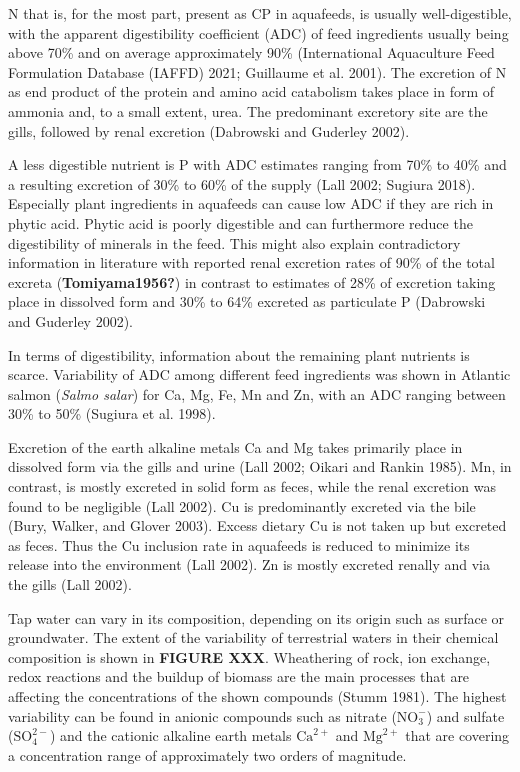\documentclass[
]{article}
\begin{document}
N that is, for the most part, present as CP in aquafeeds, is usually well-digestible, with the apparent digestibility coefficient (ADC) of feed ingredients usually being above 70\% and on average approximately 90\% (International Aquaculture Feed Formulation Database (IAFFD) 2021; Guillaume et al. 2001). The excretion of N as end product of the protein and amino acid catabolism takes place in form of ammonia and, to a small extent, urea. The predominant excretory site are the gills, followed by renal excretion (Dabrowski and Guderley 2002).

A less digestible nutrient is P with ADC estimates ranging from 70\% to 40\% and a resulting excretion of 30\% to 60\% of the supply (Lall 2002; Sugiura 2018). Especially plant ingredients in aquafeeds can cause low ADC if they are rich in phytic acid. Phytic acid is poorly digestible and can furthermore reduce the digestibility of minerals in the feed. This might also explain contradictory information in literature with reported renal excretion rates of 90\% of the total excreta (\textbf{Tomiyama1956?}) in contrast to estimates of 28\% of excretion taking place in dissolved form and 30\% to 64\% excreted as particulate P (Dabrowski and Guderley 2002).

In terms of digestibility, information about the remaining plant nutrients is scarce. Variability of ADC among different feed ingredients was shown in Atlantic salmon (\emph{Salmo salar}) for Ca, Mg, Fe, Mn and Zn, with an ADC ranging between 30\% to 50\% (Sugiura et al. 1998).

Excretion of the earth alkaline metals Ca and Mg takes primarily place in dissolved form via the gills and urine (Lall 2002; Oikari and Rankin 1985). Mn, in contrast, is mostly excreted in solid form as feces, while the renal excretion was found to be negligible (Lall 2002). Cu is predominantly excreted via the bile (Bury, Walker, and Glover 2003). Excess dietary Cu is not taken up but excreted as feces. Thus the Cu inclusion rate in aquafeeds is reduced to minimize its release into the environment (Lall 2002). Zn is mostly excreted renally and via the gills (Lall 2002).

Tap water can vary in its composition, depending on its origin such as surface or groundwater. The extent of the variability of terrestrial waters in their chemical composition is shown in \textbf{FIGURE XXX}. Wheathering of rock, ion exchange, redox reactions and the buildup of biomass are the main processes that are affecting the concentrations of the shown compounds (Stumm 1981). The highest variability can be found in anionic compounds such as nitrate (\(\text{NO}_{3}^{-}\)) and sulfate (\(\text{SO}_{4}^{2-}\)) and the cationic alkaline earth metals \(\text{Ca}^{2+}\) and \(\text{Mg}^{2+}\) that are covering a concentration range of approximately two orders of magnitude.
\end{document}
